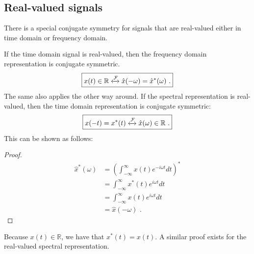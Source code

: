 \subsection{Real-valued signals}
There is a special conjugate symmetry for signals that are real-valued either in time domain or frequency domain.

If the time domain signal is real-valued, then the frequency domain representation is conjugate symmetric.
\begin{equation}
    \boxed{
        x(t) \in \mathbb{R} \xleftrightarrow{\mathcal{F}} \hat{x}(-\omega)=\hat{x}^*(\omega)\,\,.
    }
\end{equation}
The same also applies the other way around. If the spectral representation is real-valued, 
then the time domain representation is conjugate symmetric:
\begin{equation}
    \boxed{
        x(-t)=x^*(t) \xleftrightarrow{\mathcal{F}} \hat{x}(\omega) \in \mathbb{R}\,\,.
    }
\end{equation}
This can be shown as follows:
\begin{proof}
    \begin{align}
        \hat{x}^*(\omega) & = \left(\int_{-\infty}^{\infty} x(t) e^{-i\omega t}dt\right)^* \\
                          & = \int_{-\infty}^{\infty} x^*(t) e^{i\omega t}dt               \\
                          & = \int_{-\infty}^{\infty} x(t) e^{i\omega t}dt                 \\
                          & = \hat{x}(-\omega)\,\,.
    \end{align}
\end{proof}
Because $x(t)\in\mathbb{R}$, we have that $x^*(t)=x(t)$. A similar proof exists for the real-valued spectral representation.


